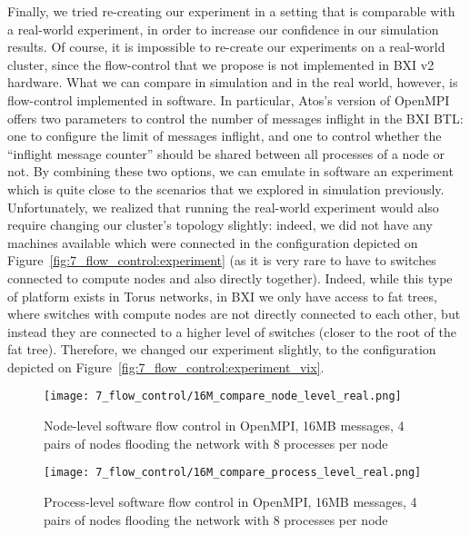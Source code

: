 Finally, we tried re-creating our experiment in a setting that is comparable
with a real-world experiment, in order to increase our confidence in our
simulation results. Of course, it is impossible to re-create our experiments on
a real-world cluster, since the flow-control that we propose is not implemented
in BXI v2 hardware. What we can compare in simulation and in the real world,
however, is flow-control implemented in software. In particular, Atos's version
of OpenMPI offers two parameters to control the number of messages inflight in
the BXI BTL: one to configure the limit of messages inflight, and one to control
whether the ``inflight message counter'' should be shared between all processes
of a node or not. By combining these two options, we can emulate in software an
experiment which is quite close to the scenarios that we explored in simulation
previously. Unfortunately, we realized that running the real-world experiment
would also require changing our cluster's topology slightly: indeed, we did not
have any machines available which were connected in the configuration depicted
on Figure~\ref{fig:7_flow_control:experiment} (as it is very rare to have to
switches connected to compute nodes and also directly together). Indeed, while
this type of platform exists in Torus networks, in BXI we only have access to
fat trees, where switches with compute nodes are not directly connected to each
other, but instead they are connected to a higher level of switches (closer to
the root of the fat tree). Therefore, we changed our experiment slightly, to the
configuration depicted on Figure~\ref{fig:7_flow_control:experiment_vix}. 

\begin{figure}[!ht]
    \centering
    \texttt{[image: 7\_flow\_control/16M\_compare\_node\_level\_real.png]}
    \caption{Node-level software flow control in OpenMPI, 16MB messages, 4 pairs of nodes flooding the network with 8 processes per node}
    \label{fig:7_flow_control:16M_compare_node_level_real}
\end{figure}

\begin{figure}[!ht]
    \centering
    \texttt{[image: 7\_flow\_control/16M\_compare\_process\_level\_real.png]}
    \caption{Process-level software flow control in OpenMPI, 16MB messages, 4 pairs of nodes flooding the network with 8 processes per node}
    \label{fig:7_flow_control:16M_compare_process_level_real}
\end{figure}

